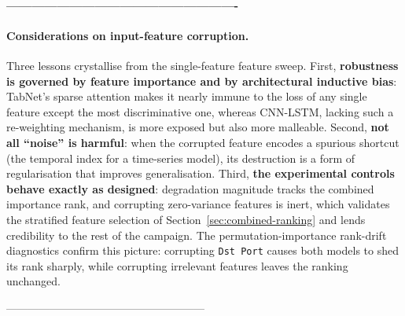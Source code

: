 

\paragraph{-------------------------------------------------------}
\paragraph{Considerations on input-feature corruption.}
Three lessons crystallise from the single-feature feature sweep. First, \textbf{robustness is governed by feature importance and by architectural inductive bias}: TabNet's sparse attention makes it nearly immune to the loss of any single feature except the most discriminative one, whereas CNN-LSTM, lacking such a re-weighting mechanism, is more exposed but also more malleable. Second, \textbf{not all ``noise'' is harmful}: when the corrupted feature encodes a spurious shortcut (the temporal index for a time-series model), its destruction is a form of regularisation that improves generalisation. Third, \textbf{the experimental controls behave exactly as designed}: degradation magnitude tracks the combined importance rank, and corrupting zero-variance features is inert, which validates the stratified feature selection of Section~\ref{sec:combined-ranking} and lends credibility to the rest of the campaign. The permutation-importance rank-drift diagnostics confirm this picture: corrupting \texttt{Dst Port} causes both models to shed its rank sharply, while corrupting irrelevant features leaves the ranking unchanged.






------------------------------------------------------

